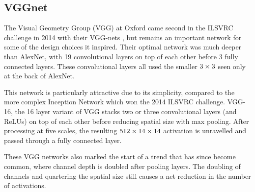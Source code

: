 
\subsection{VGGnet}
The Visual Geometry Group (VGG) at Oxford came second in the ILSVRC challenge in
2014 with their VGG-nets \cite{simonyan_very_2014}, but remains an important
network for some of the design choices it inspired. Their optimal
network was much deeper than AlexNet, with 19 convolutional layers on top of
each other before 3 fully connected layers. These convolutional layers all used
the smaller $3\times 3$ seen only at the back of AlexNet.

This network is particularly attractive due to its simplicity, compared to the
more complex Inception Network \cite{szegedy_going_2015} which won the 2014
ILSVRC challenge. VGG-16, the 16 layer variant of VGG stacks two or three
convolutional layers (and ReLUs) on top of each other before reducing spatial
size with max pooling. After processing at five scales, the resulting $512 \times 14
\times 14$ activation is unravelled and passed through a fully connected layer.

These VGG networks also marked the start of a trend that has since become
common, where channel depth is doubled after pooling layers. The doubling of
channels and quartering the spatial size still causes a net reduction in the
number of activations.

